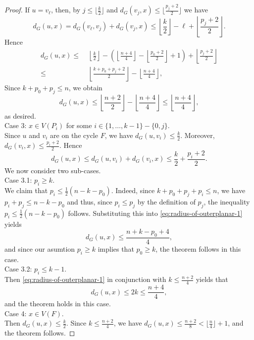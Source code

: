 \documentclass[10pt,a4paper]{amsart}
\begin{document}
\begin{proof}
If $u = v_{\ell}$, then, by $j \leq \lfloor \frac{k}{2}\rfloor$ and 
$d_G(v_j,x) \leq  \lfloor \frac{p_j+2}{2} \rfloor$ we have    
\[  d_G(u,x)  =  d_G(v_{\ell},v_j) + d_G(v_j,x) 
      \leq   \left\lfloor \frac{k}{2} \right\rfloor -\ell + \left\lfloor \frac{p_j+2}{2} \right\rfloor. \]
Hence
\begin{align*}
 d_G(u,x) \leq&\;  \left\lfloor \frac{k}{2} \right\rfloor -\left(\left\lfloor \frac{n+4}{4} \right\rfloor - \left\lfloor \frac{p_0+2}{2} \right\rfloor+ 1 \right)+ \left\lfloor \frac{p_j+2}{2} \right \rfloor\\
 \leq& \; \left\lfloor \frac{k+p_0 + p_j+2}{2} \right\rfloor  - \left\lfloor \frac{n+4}{4} \right\rfloor,
\end{align*}
Since $k+p_0+p_j \leq n$, we obtain
\[ d_G(u,x) \leq \left\lfloor \frac{n+2}{2} \right\rfloor - \left\lfloor \frac{n+4}{4} \right\rfloor
            \leq \left\lfloor \frac{n+4}{4} \right\rfloor, \]
as desired. \\[1mm]
{\sc Case 3:} $x \in V(P_i)$ for some $i \in \{1,\ldots,k-1\} - \{0,j\}$. \\
Since $u$ and $v_i$ are on the cycle $F$, we have $d_G(u,v_i) \leq \frac{k}{2}$. 
Moreover, $d_G(v_i,x) \leq \frac{p_i+2}{2}$. Hence 
\begin{equation} \label{eq:radius-of-outerplanar-1} 
d_G(u,x) \leq d_G(u,v_i) + d_G(v_i,x) \leq \frac{k}{2} +\frac{p_i+2}{2}. 
\end{equation}
We now consider two sub-cases. \\[1mm]
{\sc Case 3.1:} $p_i \geq k$. \\
We claim that $p_i \leq \frac{1}{2}(n-k-p_0)$. Indeed, since $k+p_0+p_j+p_i \leq n$,
we have $p_i + p_j \leq n-k-p_0$ and thus, since $p_i \leq p_j$ by the definition of $p_j$, 
the inequality $p_i \leq \frac{1}{2}(n-k-p_0)$ follows.
Substituting this into \eqref{eq:radius-of-outerplanar-1} yields 
\[ d_G(u,x) \leq \frac{n+k-p_0+4}{4}, \]
and since our asumtion $p_i \geq k$ implies that $p_0 \geq k$, the theorem follows in this case. \\[1mm]
{\sc Case 3.2:} $p_i \leq k-1$. \\
Then \eqref{eq:radius-of-outerplanar-1} in conjunction with $k \leq \frac{n+2}{4}$ yields that 
\[ d_G(u,x) \leq 2k \leq \frac{n+4}{4}, \]
and the theorem holds in this case. \\[1mm]
{\sc Case 4:} $x \in V(F)$. \\
Then $d_G(u,x) \leq \frac{k}{2}$. Since $k \leq \frac{n+2}{4}$, we have
$d_G(u,x) \leq \frac{n+2}{8} < \lfloor \frac{n}{4} \rfloor +1$, and the theorem follows.
\end{proof}
\end{document}
